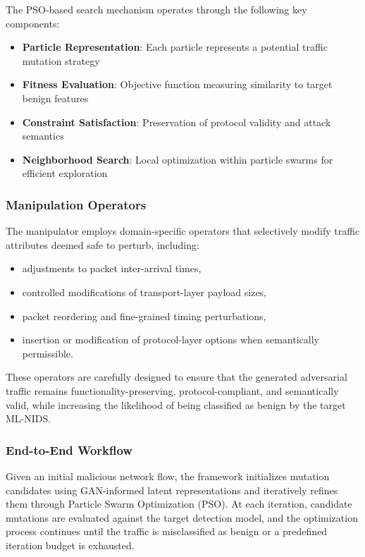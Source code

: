 The PSO-based search mechanism operates through the following key components:
\begin{itemize}
\item \textbf{Particle Representation}: Each particle represents a potential traffic mutation strategy
\item \textbf{Fitness Evaluation}: Objective function measuring similarity to target benign features
\item \textbf{Constraint Satisfaction}: Preservation of protocol validity and attack semantics
\item \textbf{Neighborhood Search}: Local optimization within particle swarms for efficient exploration
\end{itemize}

\subsubsection{Manipulation Operators}

The manipulator employs domain-specific operators that selectively modify traffic attributes deemed safe to perturb, including:

\begin{itemize}
    \item adjustments to packet inter-arrival times,
    \item controlled modifications of transport-layer payload sizes,
    \item packet reordering and fine-grained timing perturbations,
    \item insertion or modification of protocol-layer options when semantically permissible.
\end{itemize}

These operators are carefully designed to ensure that the generated adversarial traffic remains functionality-preserving, protocol-compliant, and semantically valid, while increasing the likelihood of being classified as benign by the target ML-NIDS.

\subsubsection{End-to-End Workflow}

Given an initial malicious network flow, the framework initializes mutation candidates using GAN-informed latent representations and iteratively refines them through Particle Swarm Optimization (PSO). At each iteration, candidate mutations are evaluated against the target detection model, and the optimization process continues until the traffic is misclassified as benign or a predefined iteration budget is exhausted.

